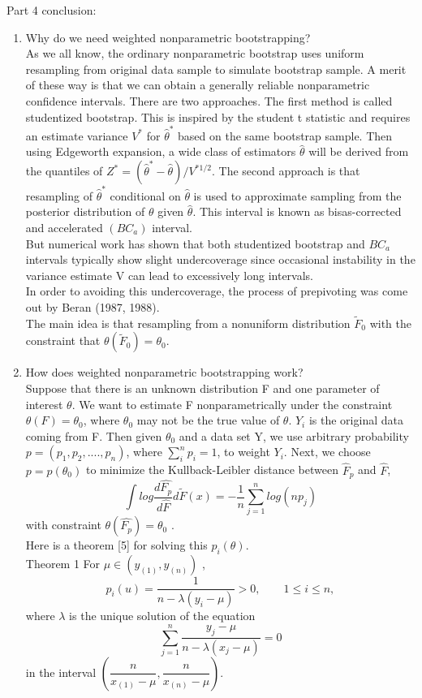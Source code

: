 \documentclass[a4paper,11pt]{article}
\begin{document}
 


Part 4 conclusion: \\
\begin{enumerate}
\item Why do we need weighted nonparametric bootstrapping? \\
As we all know, the ordinary nonparametric bootstrap uses uniform resampling from original data sample to simulate bootstrap sample. A merit of these way is that we can obtain a generally reliable nonparametric confidence intervals. There are two approaches. The first method is called studentized bootstrap. This is inspired by the student t statistic and requires an estimate variance $ V^* $ for $ \hat{\theta}^* $ based on the same bootstrap sample. Then using Edgeworth expansion, a wide class of estimators $ \hat{\theta} $ will be derived from the quantiles of $ Z^* = (\hat{\theta}^* -\hat{\theta} )/V^{*1/2} $. The second approach is that resampling of $ \hat{\theta}^* $ conditional on $ \hat{\theta} $ is used to approximate sampling from the posterior distribution of $\theta $ given $\hat{\theta} $. This interval is known as bisas-corrected and accelerated $(BC_a)$ interval.\\
But numerical work has shown that both studentized bootstrap and $ BC_a $ intervals typically show slight undercoverage since occasional instability in the variance estimate V can lead to excessively long intervals. \\
In order to avoiding this undercoverage, the process of prepivoting was come out by Beran (1987, 1988). \\
The main idea is that resampling from a nonuniform distribution $ \widetilde{F}_0 $ with the constraint that $ \theta(\widetilde{F}_0 ) = \theta_0 $.  \\

\item How does weighted nonparametric bootstrapping work? \\
Suppose that there is an unknown distribution F and one parameter of interest $ \theta $. We want to estimate F nonparametrically under the constraint $ \theta(F) =\theta_0 $, where $ \theta_0 $ may not be the true value of $ \theta $. $ Y_i $ is the original data coming from F. Then given $ \theta_0 $ and a data set Y, we use arbitrary probability $ p= ( p_1, p_2, ...., p_n ) $, where $ \sum_i ^n p_i=1 $, to weight $ Y_i $. Next, we choose $ p=p(\theta_0) $ to minimize the Kullback-Leibler distance between $ \hat{F}_p $ and $ \hat{F} $,
$$ \int log\dfrac{d \hat{F_p} }{d \hat{F}} d \widetilde{F}(x) = -\dfrac{1}{n} \sum_{j=1}^n log(n p_j) $$ with constraint $ \theta(\hat{F_p})= \theta_0 $ . \\
Here is a theorem [5] for solving this $ p_i(\theta) $. \\
Theorem 1 For $ \mu \in ( y_{(1)}, y_{(n)}) $ ,
$$ p_i(u)=\dfrac{1}{n- \lambda (y_i - \mu )} >0 , \qquad 1\le i \le n , $$
where $ \lambda $ is the unique solution of the equation $$ \sum_{j=1}^n \dfrac{y_j - \mu}{n- \lambda (x_j - \mu)}=0 $$ in the interval $(\dfrac{n}{x_{(1)}-\mu}, \dfrac{n}{x_{(n)}-\mu} )$.


\end{enumerate}
\end{document}
